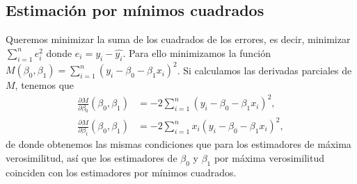 \subsection{Estimación por mínimos cuadrados}
Queremos minimizar la suma de los cuadrados de los errores, es decir, minimizar $\sum_{i=1}^n e_i^2$  donde $e_i = y_i - \hat{y_i}$. Para ello minimizamos la función $M(\beta_0, \beta_1) = \sum_{i=1}^n (y_i - \beta_0 - \beta_1x_i)^2$. Si calculamos las derivadas parciales de $M$, tenemos que
\begin{align*}
    \frac{\partial M}{\partial \beta_0}(\beta_0,\beta_1) & = -2\sum_{i=1}^n (y_i - \beta_0 - \beta_1x_i)^2,    \\
    \frac{\partial M}{\partial \beta_1}(\beta_0,\beta_1) & = -2\sum_{i=1}^n x_i(y_i - \beta_0 - \beta_1x_i)^2,
\end{align*}
de donde obtenemos las mismas condiciones que para los estimadores de máxima verosimilitud, así que los estimadores de $\beta_0$ y $\beta_1$ por máxima verosimilitud coinciden con los estimadores por mínimos cuadrados.


